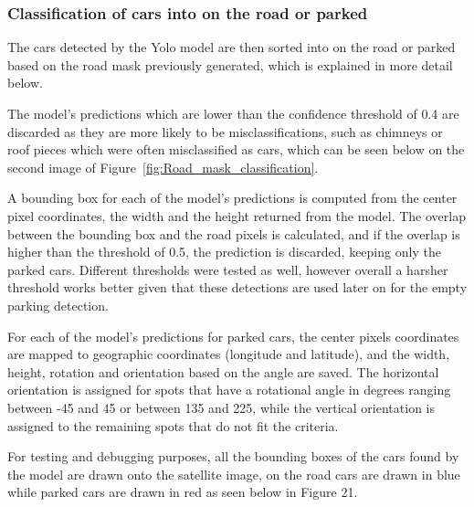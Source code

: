 \newpage{}

\subsubsection{Classification of cars into on the road or parked}
The cars detected by the Yolo model are then sorted into on the road or parked
based on the road mask previously generated, which is explained in more detail
below.

The model's predictions which are lower than the confidence threshold of 0.4 are
discarded as they are more likely to be misclassifications, such as chimneys or
roof pieces which were often misclassified as cars, which can be seen below on
the second image of Figure~\ref{fig:Road_mask_classification}.

A bounding box for each of the model's predictions is computed from the center
pixel coordinates, the width and the height returned from the model. The overlap
between the bounding box and the road pixels is calculated, and if the overlap
is higher than the threshold of 0.5, the prediction is discarded, keeping only
the parked cars. Different thresholds were tested as well, however overall a
harsher threshold works better given that these detections are used later on for
the empty parking detection.

For each of the model's predictions for parked cars, the center pixels
coordinates are mapped to geographic coordinates (longitude and latitude), and
the width, height, rotation and orientation based on the angle are saved. The
horizontal orientation is assigned for spots that have a rotational angle in
degrees ranging between -45 and 45 or between 135 and 225, while the vertical
orientation is assigned to the remaining spots that do not fit the criteria.

For testing and debugging purposes, all the bounding boxes of the cars found by
the model are drawn onto the satellite image, on the road cars are drawn in blue
while parked cars are drawn in red as seen below in
Figure 21.

